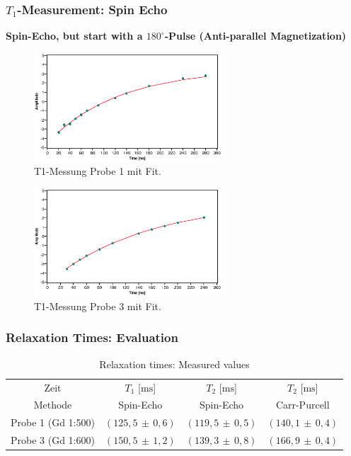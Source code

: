 \documentclass[aspectratio=169]{beamer}
\newcommand{\err}[2]{( #1 \, \pm \, #2 )}
\begin{document}
\begin{frame}
	\frametitle{$T_1$-Measurement: Spin Echo}
	\textbf{Spin-Echo, but start with a $180^\circ$-Pulse (Anti-parallel Magnetization)}
	\begin{minipage}[t]{0.45\textwidth}
		\centering
		\begin{figure}
			\includegraphics[width=70mm]{./Resources/t1_meas_p1.eps}
			\caption{T1-Messung Probe 1 mit Fit.}
			\label{fig:t1_p1}
		\end{figure}
	\end{minipage}
	\hfill
	\begin{minipage}[t]{0.45\textwidth}
		\centering
		\begin{figure}
			\includegraphics[width=70mm]{./Resources/t1_meas_p3.eps}
			\caption{T1-Messung Probe 3 mit Fit.}
			\label{fig:t1_p3}
		\end{figure}
	\end{minipage}
\end{frame}

\begin{frame}
	\frametitle{Relaxation Times: Evaluation}
	\begin{table}[H] 
		\centering
		\caption{Relaxation times: Measured values}
		\label{tab:relaxtimes}
		\begin{tabular}{cccc}
			\toprule
			Zeit & $T_1$ [$\mathrm{ms}$] & $T_2$ [$\mathrm{ms}$] & $T_2$ [$\mathrm{ms}$]\\
			Methode & Spin-Echo & Spin-Echo & Carr-Purcell\\
			\midrule
			Probe 1 (Gd 1:500)& $\err{125,5}{0,6}$ & $\err{119,5}{0,5}$ & $\err{140,1}{0,4}$\\
			Probe 3 (Gd 1:600)& $\err{150,5}{1,2}$ & $\err{139,3}{0,8}$ & $\err{166,9}{0,4}$\\
			\bottomrule
		\end{tabular}
	\end{table}
	
\end{frame}
\end{document}
